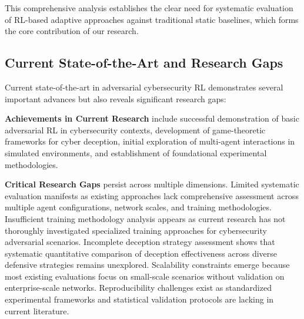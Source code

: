 \documentclass[12pt,oneside]{article}
\begin{document}
This comprehensive analysis establishes the clear need for systematic evaluation of RL-based adaptive approaches against traditional static baselines, which forms the core contribution of our research.

\subsection{Current State-of-the-Art and Research Gaps}

Current state-of-the-art in adversarial cybersecurity RL demonstrates several important advances but also reveals significant research gaps:

\textbf{Achievements in Current Research} include successful demonstration of basic adversarial RL in cybersecurity contexts, development of game-theoretic frameworks for cyber deception, initial exploration of multi-agent interactions in simulated environments, and establishment of foundational experimental methodologies.

\textbf{Critical Research Gaps} persist across multiple dimensions. Limited systematic evaluation manifests as existing approaches lack comprehensive assessment across multiple agent configurations, network scales, and training methodologies. Insufficient training methodology analysis appears as current research has not thoroughly investigated specialized training approaches for cybersecurity adversarial scenarios. Incomplete deception strategy assessment shows that systematic quantitative comparison of deception effectiveness across diverse defensive strategies remains unexplored. Scalability constraints emerge because most existing evaluations focus on small-scale scenarios without validation on enterprise-scale networks. Reproducibility challenges exist as standardized experimental frameworks and statistical validation protocols are lacking in current literature.
\end{document}
